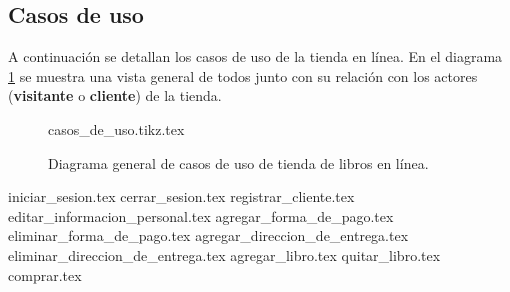 %
%

\subsection{Casos de uso}

A continuación se detallan los casos de uso de la tienda en línea. En el
diagrama \ref{lib_casos_de_uso_general} se muestra una vista
general de todos junto con su relación con los actores (\textbf{visitante} o
\textbf{cliente}) de la tienda.

\begin{figure}
  \begin{center}
    {casos_de_uso.tikz.tex}
    \caption{Diagrama general de casos de uso de tienda de libros en línea.}
    \label{lib_casos_de_uso_general}
  \end{center}
\end{figure}

{iniciar_sesion.tex}
{cerrar_sesion.tex}
{registrar_cliente.tex}
{editar_informacion_personal.tex}
{agregar_forma_de_pago.tex}
{eliminar_forma_de_pago.tex}
{agregar_direccion_de_entrega.tex}
{eliminar_direccion_de_entrega.tex}
{agregar_libro.tex}
{quitar_libro.tex}
{comprar.tex}
